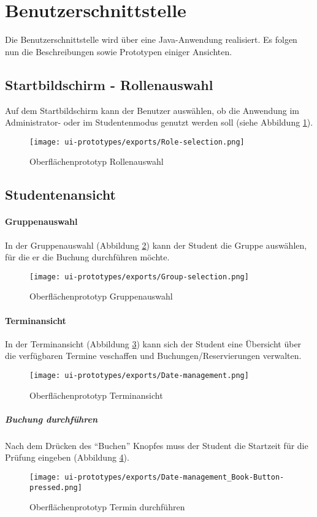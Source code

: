 \section{Benutzerschnittstelle}
Die Benutzerschnittstelle wird über eine Java-Anwendung realisiert. Es folgen nun die Beschreibungen sowie Prototypen einiger Ansichten.
\subsection{Startbildschirm - Rollenauswahl}
Auf dem Startbildschirm kann der Benutzer auswählen, ob die Anwendung im Administrator- oder im Studentenmodus genutzt werden soll (siehe Abbildung \ref{fig:role-selection}).
\begin{figure}
  \centering
  \texttt{[image: ui-prototypes/exports/Role-selection.png]}
  \caption{Oberflächenprototyp Rollenauswahl}
  \label{fig:role-selection}
\end{figure}

\subsection{Studentenansicht}

\paragraph{Gruppenauswahl}
In der Gruppenauswahl (Abbildung \ref{fig:group-selection}) kann der Student die Gruppe auswählen, für die er die Buchung durchführen möchte.
\begin{figure}
  \centering
  \texttt{[image: ui-prototypes/exports/Group-selection.png]}
  \caption{Oberflächenprototyp Gruppenauswahl}
  \label{fig:group-selection}
\end{figure}

\paragraph{Terminansicht}
In der Terminansicht (Abbildung \ref{fig:date-management}) kann sich der Student eine Übersicht über die
verfügbaren Termine veschaffen und Buchungen/Reservierungen verwalten.
\begin{figure}
  \centering
  \texttt{[image: ui-prototypes/exports/Date-management.png]}
  \caption{Oberflächenprototyp Terminansicht}
  \label{fig:date-management}
\end{figure}

\subparagraph{Buchung durchführen}
Nach dem Drücken des ``Buchen'' Knopfes muss der Student die Startzeit für die Prüfung eingeben (Abbildung \ref{fig:date-management-book-button-pressed}).
\begin{figure}
  \centering
  \texttt{[image: ui-prototypes/exports/Date-management\_Book-Button-pressed.png]}
  \caption{Oberflächenprototyp Termin durchführen}
  \label{fig:date-management-book-button-pressed}
\end{figure}

